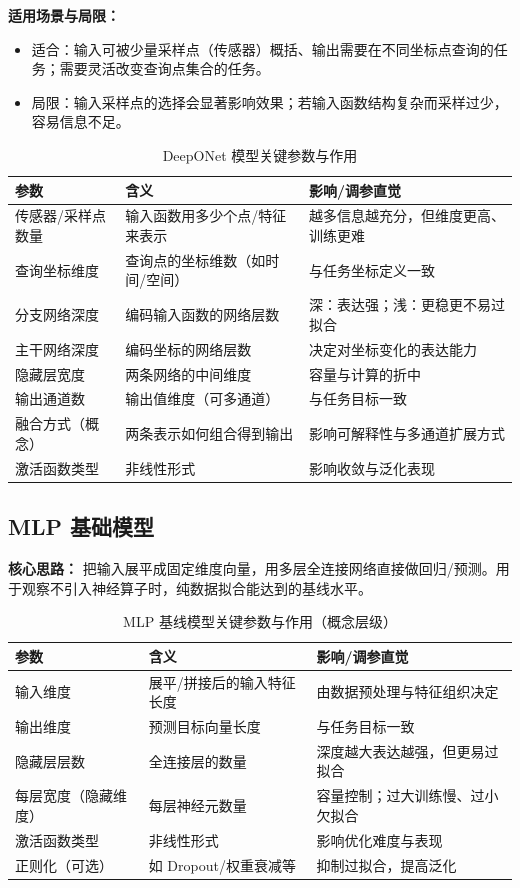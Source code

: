 \documentclass[12pt,a4paper]{article}
\begin{document}
\textbf{适用场景与局限：}
\begin{itemize}
    \item 适合：输入可被少量采样点（传感器）概括、输出需要在不同坐标点查询的任务；需要灵活改变查询点集合的任务。
    \item 局限：输入采样点的选择会显著影响效果；若输入函数结构复杂而采样过少，容易信息不足。
\end{itemize}

\begin{table}[h]
\centering
\caption{DeepONet 模型关键参数与作用}
\begin{tabular}{@{}lll@{}}
\toprule
参数 & 含义 & 影响/调参直觉 \\ \midrule
传感器/采样点数量 & 输入函数用多少个点/特征来表示 & 越多信息越充分，但维度更高、训练更难 \\
查询坐标维度 & 查询点的坐标维数（如时间/空间） & 与任务坐标定义一致 \\
分支网络深度 & 编码输入函数的网络层数 & 深：表达强；浅：更稳更不易过拟合 \\
主干网络深度 & 编码坐标的网络层数 & 决定对坐标变化的表达能力 \\
隐藏层宽度 & 两条网络的中间维度 & 容量与计算的折中 \\
输出通道数 & 输出值维度（可多通道） & 与任务目标一致 \\
融合方式（概念） & 两条表示如何组合得到输出 & 影响可解释性与多通道扩展方式 \\ 
激活函数类型 & 非线性形式 & 影响收敛与泛化表现 \\
\bottomrule
\end{tabular}
\end{table}

\subsection{MLP 基础模型}
\textbf{核心思路：} 把输入展平成固定维度向量，用多层全连接网络直接做回归/预测。用于观察不引入神经算子时，纯数据拟合能达到的基线水平。

\begin{table}[h]
\centering
\caption{MLP 基线模型关键参数与作用（概念层级）}
\begin{tabular}{@{}lll@{}}
\toprule
参数 & 含义 & 影响/调参直觉 \\ \midrule
输入维度 & 展平/拼接后的输入特征长度 & 由数据预处理与特征组织决定 \\
输出维度 & 预测目标向量长度 & 与任务目标一致 \\
隐藏层层数 & 全连接层的数量 & 深度越大表达越强，但更易过拟合 \\
每层宽度（隐藏维度） & 每层神经元数量 & 容量控制；过大训练慢、过小欠拟合 \\
激活函数类型 & 非线性形式 & 影响优化难度与表现 \\
正则化（可选） & 如 Dropout/权重衰减等 & 抑制过拟合，提高泛化 \\
\bottomrule
\end{tabular}
\end{table}
\end{document}
